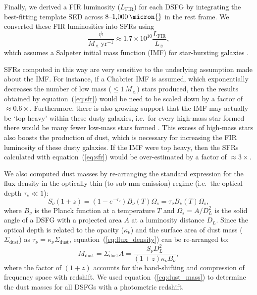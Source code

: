 \documentclass[a4paper, fleqn, usenatbib]{mnras}
\newcommand{\lfir}{L_{\text{FIR}}}
\newcommand{\lsol}{L_{\sun}}
\newcommand{\mdust}{M_{\text{dust}}}
\newcommand{\msol}{M_{\sun}}
\begin{document}
Finally, we derived a FIR luminosity ($\lfir{}$) for each DSFG by integrating the best-fitting template SED across $8\text{--}1{,}000\,\micron{}$ in the rest frame.
We converted these FIR luminosities into SFRs using 
\begin{equation}
    \label{eq:sfr}
    \frac{\psi}{\msol{}\,\text{yr}^{-1}}\approx1.7\times10^{10}\frac{\lfir{}}{\lsol{}},
\end{equation}
which assumes a Salpeter initial mass function (IMF) for star-bursting galaxies \citep{kennicutt98}.

SFRs computed in this way are very sensitive to the underlying assumption made about the IMF.
For instance, if a Chabrier IMF \citep{chabrier03} is assumed, which exponentially decreases the number of low mass ($\le1\,\msol{}$) stars produced, then the results obtained by equation~(\ref{eq:sfr}) would be need to be scaled down by a factor of $\approx0.6\times$.
Furthermore, there is also growing support that the IMF may actually be `top heavy' within these dusty galaxies, i.e.\ for every high-mass star formed there would be many fewer low-mass stars formed \citep[][but see \citeauthor{hayward13}, \citeyear{hayward13}; \citeauthor{safarzadeh17}, \citeyear{safarzadeh17}]{baugh05, romano17, zhang18}.
This excess of high-mass stars also boosts the production of dust, which is necessary for increasing the FIR luminosity of these dusty galaxies.
If the IMF were top heavy, then the SFRs calculated with equation~(\ref{eq:sfr}) would be over-estimated by a factor of $\approx3\times$.

We also computed dust masses by re-arranging the standard expression for the flux density in the optically thin (to sub-mm emission) regime (i.e.\ the optical depth $\tau_{\nu}\ll1$):
\begin{equation}
    \label{eq:flux_density}
    S_{\nu}(1+z) = \left(1-e^{-\tau_{\nu}}\right)B_{\nu}(T)\Omega_s = \tau_{\nu}B_{\nu}(T)\Omega_s,
\end{equation}
where $B_{\nu}$ is the Planck function at a temperature $T$ and $\Omega_s=A/D_L^2$ is the solid angle of a DSFG with a projected area $A$ at a luminosity distance $D_L$.
Since the optical depth is related to the opacity ($\kappa_{\nu}$) and the surface area of dust mass ($\Sigma_{\text{dust}}$) as $\tau_{\nu}=\kappa_{\nu}\Sigma_{\text{dust}}$, equation~(\ref{eq:flux_density}) can be re-arranged to:
\begin{equation}
    \label{eq:dust_mass}
    \mdust{} = \Sigma_{\text{dust}}A = \frac{ S_{\nu} D_L^2 }{(1+z)\kappa_{\nu}B_{\nu}},
\end{equation}
where the factor of $(1+z)$ accounts for the band-shifting and compression of frequency space with redshift.
We used equation~(\ref{eq:dust_mass}) to determine the dust masses for all DSFGs with a photometric redshift.
\end{document}

